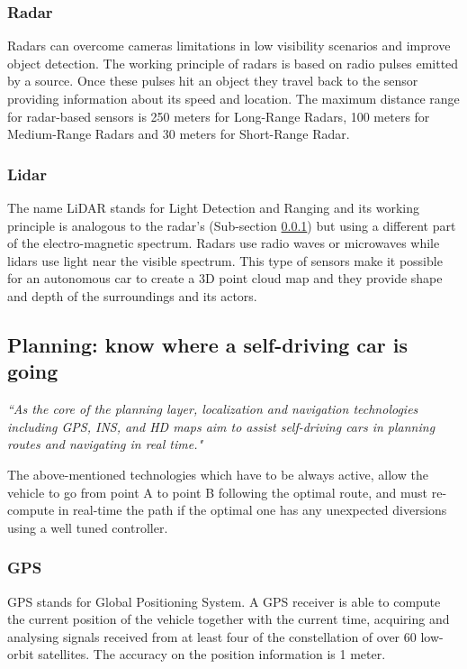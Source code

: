 \subsubsection{Radar} \label{radar}
Radars can overcome cameras limitations in low visibility scenarios and improve object detection.
The working principle of radars is based on radio pulses emitted by a source. Once these pulses hit an object they travel back to the sensor providing information about its speed and location. 
The maximum distance range for radar-based sensors is 250 meters for Long-Range Radars, 100 meters for Medium-Range Radars and 30 meters for Short-Range Radar.

\subsubsection{Lidar}
The name LiDAR stands for Light Detection and Ranging and its working principle is analogous to the radar's (Sub-section \ref{radar}) but using a different part of the electro-magnetic spectrum. Radars use radio waves or microwaves while lidars use light near the visible spectrum.
This type of sensors make it possible for an autonomous car to create a 3D point cloud map and they provide shape and depth of the surroundings and its actors.

\subsection{Planning: know where a self-driving car is going}

\textit{``As the core of the planning layer, localization and navigation technologies including GPS, INS, and HD maps aim to assist self-driving cars in planning routes and navigating in real time."} \cite{luo2019localization}

\vspace{2mm}

The above-mentioned technologies which have to be always active, allow the vehicle to go from point A to point B following the optimal route, and must re-compute in real-time the path if the optimal one has any unexpected diversions using a well tuned controller.

\subsubsection{GPS}
GPS stands for Global Positioning System. A GPS receiver is able to compute the current position of the vehicle together with the current time, acquiring and analysing signals received from at least four of the constellation of over 60 low-orbit satellites. 
The accuracy on the position information is 1 meter.

